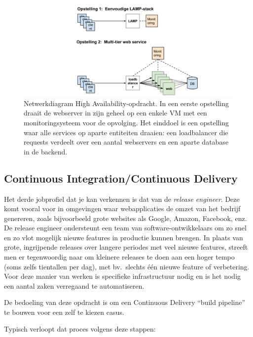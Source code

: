 \begin{figure}
  \centering
  \includegraphics[width=\textwidth]{img/assignment-ha.png}
  \caption[Netwerkdiagram High Availability-opdracht]{Netwerkdiagram High Availability-opdracht. In een eerste opstelling draait de webserver in zijn geheel op een enkele VM met een monitoringsysteem voor de opvolging. Het einddoel is een opstelling waar alle services op aparte entiteiten draaien: een loadbalancer die requests verdeelt over een aantal webservers en een aparte database in de backend.}
  \label{fig:ha}
\end{figure}

\subsection{Continuous Integration/Continuous Delivery}
\label{subs:continuous-delivery}

Het derde jobprofiel dat je kan verkennen is dat van de \textit{release engineer}. Deze komt vooral voor in omgevingen waar webapplicaties de omzet van het bedrijf genereren, zoals bijvoorbeeld grote websites als Google, Amazon, Facebook, enz. De release engineer ondersteunt een team van software-ontwikkelaars om zo snel en zo vlot mogelijk nieuwe features in productie kunnen brengen. In plaats van grote, ingrijpende releases over langere periodes met veel nieuwe features, streeft men er tegenwoordig naar om kleinere releases te doen aan een hoger tempo (soms zelfs tientallen per dag), met bv.~slechts één nieuwe feature of verbetering. Voor deze manier van werken is specifieke infrastructuur nodig en is het nodig een aantal zaken verregaand te automatiseren.

De bedoeling van deze opdracht is om een Continuous Delivery ``build pipeline'' te bouwen voor een zelf te kiezen casus.

Typisch verloopt dat proces volgens deze stappen:

